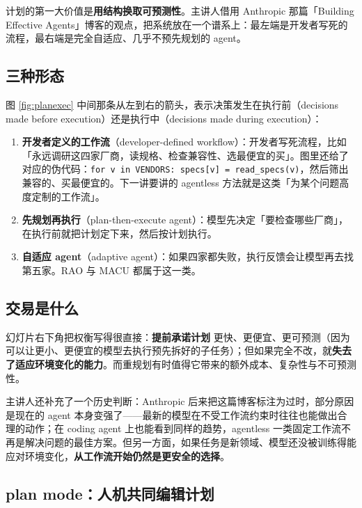 \documentclass[a4paper]{article}
\begin{document}
计划的第一大价值是\textbf{用结构换取可预测性}。主讲人借用 Anthropic 那篇「Building Effective Agents」博客的观点，把系统放在一个谱系上：最左端是开发者写死的流程，最右端是完全自适应、几乎不预先规划的 agent。

\subsection{三种形态}

图 \ref{fig:planexec} 中间那条从左到右的箭头，表示决策发生在执行前（decisions made before execution）还是执行中（decisions made during execution）：

\begin{enumerate}
\item \textbf{开发者定义的工作流}（developer-defined workflow）：开发者写死流程，比如「永远调研这四家厂商，读规格、检查兼容性、选最便宜的买」。图里还给了对应的伪代码：\texttt{for v in VENDORS: specs[v] = read\_specs(v)}，然后筛出兼容的、买最便宜的。下一讲要讲的 agentless 方法就是这类「为某个问题高度定制的工作流」。
\item \textbf{先规划再执行}（plan-then-execute agent）：模型先决定「要检查哪些厂商」，在执行前就把计划定下来，然后按计划执行。
\item \textbf{自适应 agent}（adaptive agent）：如果四家都失败，执行反馈会让模型再去找第五家。RAO 与 MACU 都属于这一类。
\end{enumerate}

\subsection{交易是什么}

幻灯片右下角把权衡写得很直接：\textbf{提前承诺计划} 更快、更便宜、更可预测（因为可以让更小、更便宜的模型去执行预先拆好的子任务）；但如果完全不改，就\textbf{失去了适应环境变化的能力}。而重规划有时值得它带来的额外成本、复杂性与不可预测性。

主讲人还补充了一个历史判断：Anthropic 后来把这篇博客标注为过时，部分原因是现在的 agent 本身变强了——最新的模型在不受工作流约束时往往也能做出合理的动作；在 coding agent 上也能看到同样的趋势，agentless 一类固定工作流不再是解决问题的最佳方案。但另一方面，如果任务是新领域、模型还没被训练得能应对环境变化，\textbf{从工作流开始仍然是更安全的选择}。

\subsection{plan mode：人机共同编辑计划}
\end{document}
